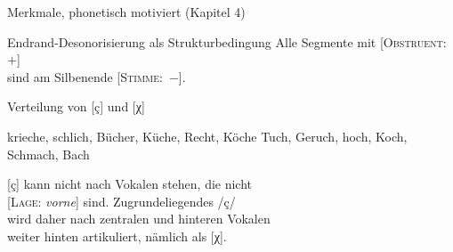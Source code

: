 \begin{frame}
  {Merkmale, phonetisch motiviert (Kapitel 4)}
  \pause
\end{frame}


\begin{frame}
  {Endrand-Desonorisierung als Strukturbedingung}
  \pause
  \Large
  Alle Segmente mit [\textsc{Obstruent}:~$+$]\\
  sind am Silbenende [\textsc{Stimme}:~$-$].
\end{frame}


\begin{frame}
  {Verteilung von [ç] und [χ]}
  \pause
  \begin{exe}
    \ex
    \begin{xlist}
      \ex krieche, schlich, Bücher, Küche, Recht, Köche
      \pause
      \ex Tuch, Geruch, hoch, Koch, Schmach, Bach
    \end{xlist}
  \end{exe}
  \pause
  \Zeile
  \Large
  [ç] kann nicht nach Vokalen stehen, die nicht\\
  {[\textsc{Lage}: \textit{vorne}]} sind. Zugrundeliegendes /ç/\\
  wird daher nach zentralen und hinteren Vokalen\\
  weiter hinten artikuliert, nämlich als [χ].
\end{frame}

